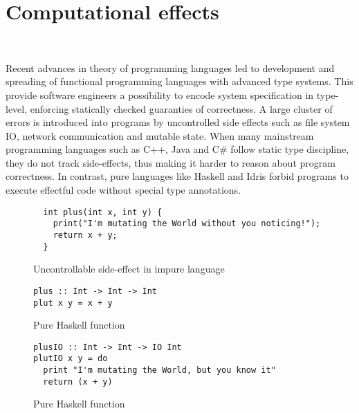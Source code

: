 \chapter{Computational effects}
~\label{cpt-effects}


  Recent advances in theory of programming languages led to development and spreading
  of functional programming languages with advanced type systems. This provide
  software engineers a possibility to encode system specification in type-level, enforcing statically checked guaranties of correctness. A large cluster of errors is
  introduced into programs by uncontrolled side effects such as file system IO,
  network communication and mutable state. When many mainstream programming languages such as C++, Java and C\# follow static type discipline, they do not track
  side-effects, thus making it harder to reason about program correctness. In contrast,
  pure languages like Haskell and Idris forbid programs to execute effectful code
  without special type annotations.

  \begin{figure}[t]
  \begin {lstlisting}
  int plus(int x, int y) {
    print("I'm mutating the World without you noticing!");
    return x + y;
  }
  \end{lstlisting}
  \caption{Uncontrollable side-effect in impure language}
  \label{listing:effectfulPlus}
  \end{figure}

  \begin{figure}[t]
  \begin{lstlisting}
plus :: Int -> Int -> Int
plut x y = x + y
  \end{lstlisting}
  \caption{Pure Haskell function}
  \label{listing:purePlusHaskell}
  \end{figure}

  \begin{figure}[t]
  \begin{lstlisting}
plusIO :: Int -> Int -> IO Int
plutIO x y = do
  print "I'm mutating the World, but you know it"
  return (x + y)
  \end{lstlisting}
  \caption{Pure Haskell function}
  \label{listing:purePlusHaskell}
  \end{figure}

